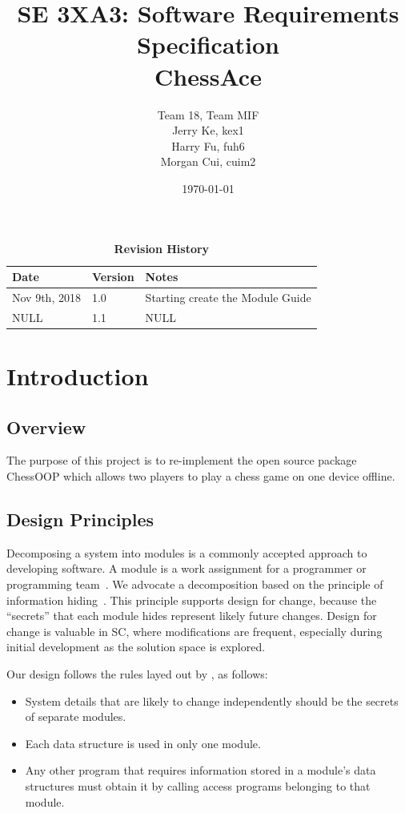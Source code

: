 \documentclass[12pt, titlepage]{article}
\title{SE 3XA3: Software Requirements Specification\\ChessAce}
\author{Team 18, Team MIF
		\\ Jerry Ke, kex1
		\\ Harry Fu, fuh6
		\\ Morgan Cui, cuim2
}
\date{\today}
\begin{document}
\maketitle

\tableofcontents
\listoftables
\listoffigures

\begin{table}[bp]
\caption{\bf Revision History}
\begin{tabularx}{\textwidth}{p{3cm}p{2cm}X}
\toprule {\bf Date} & {\bf Version} & {\bf Notes}\\
\midrule
Nov 9th, 2018 & 1.0 & Starting create the Module Guide \\
NULL & 1.1 & NULL\\
\bottomrule
\end{tabularx}
\end{table}




\section{Introduction}

\subsection{Overview}
The purpose of this project is to re-implement the open source package ChessOOP which allows two players to play a chess game on one device offline.

\subsection{Design Principles}
Decomposing a system into modules is a commonly accepted approach to developing
software.  A module is a work assignment for a programmer or programming
team~\citep{ParnasEtAl1984}.  We advocate a decomposition
based on the principle of information hiding~\citep{Parnas1972a}.  This
principle supports design for change, because the ``secrets'' that each module
hides represent likely future changes.  Design for change is valuable in SC,
where modifications are frequent, especially during initial development as the
solution space is explored.  ~\citep{Bokahari2018}

Our design follows the rules layed out by \citet{ParnasEtAl1984}, as follows:
\begin{itemize}
\item System details that are likely to change independently should be the
  secrets of separate modules.
\item Each data structure is used in only one module.
\item Any other program that requires information stored in a module's data
  structures must obtain it by calling access programs belonging to that module.
\end{itemize}
\end{document}
